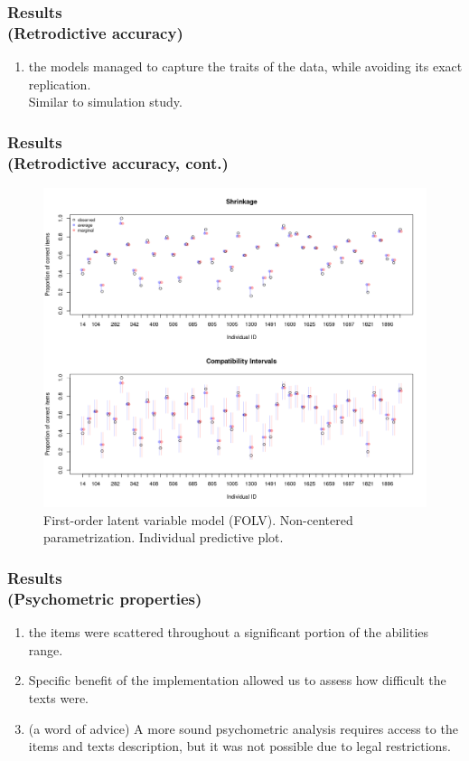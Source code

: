 \documentclass[nonav,sleutel]{beamer}
\begin{document}
	\begin{frame}
		\frametitle{Results \\
			(Retrodictive accuracy)}
		\begin{enumerate}
			\item the models managed to capture the traits of the data, while avoiding its exact replication.\\
			\vspace{0.3cm} Similar to simulation study.
		\end{enumerate} 
	\end{frame}
	\begin{frame}
		\frametitle{Results \\
			(Retrodictive accuracy, cont.)}
		\begin{figure}[H]
			\centering
			\includegraphics[width=0.70\linewidth]{FOLV_NC_HitRate_ind}
			\caption{First-order latent variable model (FOLV). Non-centered parametrization. Individual predictive plot.}
			\label{fig:FOLV_pred_app}
		\end{figure} 
	\end{frame}
	\begin{frame}
		\frametitle{Results \\
			(Psychometric properties)}
		\begin{enumerate}
			\item the items were scattered throughout a significant portion of the abilities range. 
			\item Specific benefit of the implementation allowed us to assess
			how difficult the texts were.
			\item (a word of advice) A more sound psychometric analysis requires access to the items and texts description, but it was not possible due to legal restrictions.
		\end{enumerate} 
	\end{frame}
\end{document}
